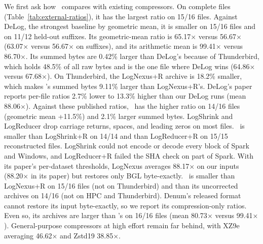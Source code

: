 We first ask how \tool\ compares with existing compressors. On complete files (Table~\ref{tab:external-ratios}), it has the largest ratio on 15/16 files. Against DeLog, the strongest baseline by geometric mean, it is smaller on 15/16 files and on 11/12 held-out suffixes. Its geometric-mean ratio is 65.17$\times$ versus 56.67$\times$ (63.07$\times$ versus 56.67$\times$ on suffixes), and its arithmetic mean is 99.41$\times$ versus 86.70$\times$. Its summed bytes are 0.42\% larger than DeLog's because of Thunderbird, which holds 48.5\% of all raw bytes and is the one file where DeLog wins (64.86$\times$ versus 67.68$\times$). On Thunderbird, the LogNexus+R archive is 18.2\% smaller, which makes \tool's summed bytes 9.11\% larger than LogNexus+R's.
DeLog's paper reports per-file ratios 2.7\% lower to 13.3\% higher than our DeLog runs (mean 88.06$\times$). Against these published ratios, \tool\ has the higher ratio on 14/16 files (geometric mean +11.5\%) and 2.1\% larger summed bytes.
LogShrink and LogReducer drop carriage returns, spaces, and leading zeros on most files. \tool\ is smaller than LogShrink+R on 14/14 and than LogReducer+R on 15/15 reconstructed files. LogShrink could not encode or decode every block of Spark and Windows, and LogReducer+R failed the SHA check on part of Spark. With its paper\textquoteright s per-dataset thresholds, LogNexus averages 88.17$\times$ on our inputs (88.20$\times$ in its paper) but restores only BGL byte-exactly. \tool\ is smaller than LogNexus+R on 15/16 files (not on Thunderbird) and than its uncorrected archives on 14/16 (not on HPC and Thunderbird). Denum\textquoteright s released format cannot restore its input byte-exactly, so we report its compression-only ratios. Even so, its archives are larger than \tool\textquoteright s on 16/16 files (mean 80.73$\times$ versus 99.41$\times$). General-purpose compressors at high effort remain far behind, with XZ9e averaging 46.62$\times$ and Zstd19 38.85$\times$.
